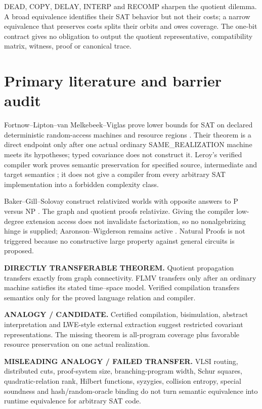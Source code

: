 \documentclass[11pt]{article}
\begin{document}
DEAD, COPY, DELAY, INTERP and RECOMP sharpen the quotient dilemma.  A broad
equivalence identifies their SAT behavior but not their costs; a narrow
equivalence that preserves costs splits their orbits and owes coverage.  The
one-bit contract gives no obligation to output the quotient representative,
compatibility matrix, witness, proof or canonical trace.

\section{Primary literature and barrier audit}
Fortnow--Lipton--van Melkebeek--Viglas prove lower bounds for SAT on declared
deterministic random-access machines and resource regions \cite{flmv}.
Their theorem is a direct endpoint only after one actual ordinary
SAME\_REALIZATION machine meets its hypotheses; typed covariance does not
construct it.  Leroy's verified compiler work proves semantic preservation
for specified source, intermediate and target semantics \cite{leroy}; it
does not give a compiler from every arbitrary SAT implementation into a
forbidden complexity class.

Baker--Gill--Solovay construct relativized worlds with opposite answers to
P versus NP \cite{bgs}.  The graph and quotient proofs relativize.  Giving
the compiler low-degree extension access does not invalidate factorization,
so no nonalgebrizing hinge is supplied; Aaronson--Wigderson remains active
\cite{aw}.  Natural Proofs is not triggered because no constructive large
property against general circuits is proposed.

\begin{description}[leftmargin=0cm,labelwidth=0cm]
\item[] \textbf{DIRECTLY TRANSFERABLE THEOREM.}
Quotient propagation transfers exactly from graph connectivity.  FLMV
transfers only after an ordinary machine satisfies its stated time--space
model.  Verified compilation transfers semantics only for the proved
language relation and compiler.
\item[] \textbf{ANALOGY / CANDIDATE.}
Certified compilation, bisimulation, abstract interpretation and LWE-style
external extraction suggest restricted covariant representations.  The
missing theorem is all-program coverage plus favorable resource preservation
on one actual realization.
\item[] \textbf{MISLEADING ANALOGY / FAILED TRANSFER.}
VLSI routing, distributed cuts, proof-system size, branching-program width,
Schur squares, quadratic-relation rank, Hilbert functions, syzygies,
collision entropy, special soundness and hash/random-oracle binding do not
turn semantic equivalence into runtime equivalence for arbitrary SAT code.
\end{description}
\end{document}

